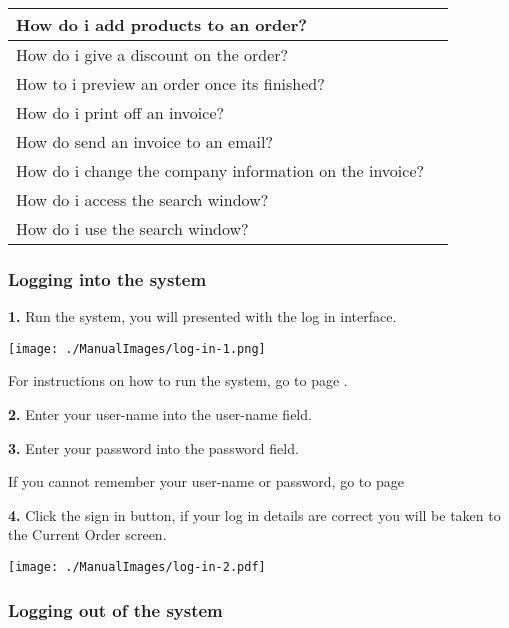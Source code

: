 \begin{center}
\begin{longtable}{|p{8cm}|p{3cm}|}
	How do i add products to an order?&  \pageref{fig:Adding products to an order} \\ \hline
	How do i give a discount on the order? &  \pageref{fig:Applying a Discount to an Order} \\ \hline
	How to i preview an order once its finished?&  \pageref{fig:Previewing the invoice} \\ \hline
	How do i print off an invoice?&  \pageref{fig:Printing an invoice} \\ \hline
	How do send an invoice to an email?&  \pageref{fig:Emailing an invoice} \\ \hline
	How do i change the company information on the invoice? &  \pageref{fig:Changing information on the invoice} \\ \hline
	How do i access the search window?&  \pageref{fig:Accessing the search window} \\ \hline
	How do i use the search window?&  \pageref{fig:Using the search window} \\ \hline
	\end{longtable}
\end{center}
\pagebreak

\subsubsection{Logging into the system}
\label{fig:Logging into the system}

\textbf{1.} Run the system, you will presented with the log in interface.
 
\texttt{[image: ./ManualImages/log-in-1.png]}
  
For instructions on how to run the system, go to page \pageref{fig:Running the System}.

\textbf{2.} Enter your user-name into the user-name field.

\textbf{3.} Enter your password into the password field.

If you cannot remember your user-name or password, go to page \pageref{fig:Forgetting Your User-name or Password}

\textbf{4.} Click the sign in button, if your log in details are correct you will be taken to the Current Order screen.

\texttt{[image: ./ManualImages/log-in-2.pdf]}

\pagebreak
\subsubsection{Logging out of the system}
\label{fig:Logging out of the system}


